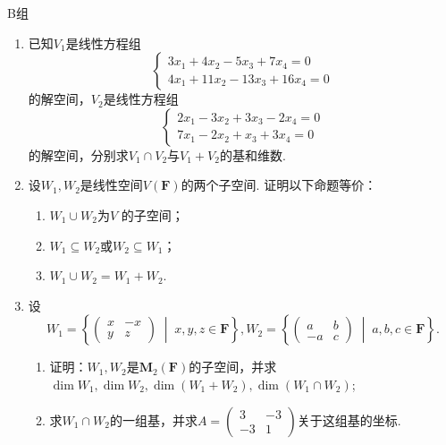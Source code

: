 \centerline{\heiti B组}
\begin{enumerate}
    \item 已知$V_1$是线性方程组\[\begin{cases}
                  3x_1+4x_2-5x_3+7x_4=0 \\
                  4x_1+11x_2-13x_3+16x_4=0
              \end{cases}\]
          的解空间，$V_2$是线性方程组\[\begin{cases}
                  2x_1-3x_2+3x_3-2x_4=0 \\
                  7x_1-2x_2+x_3+3x_4=0
              \end{cases}\]
          的解空间，分别求$V_1 \cap V_2$与$V_1+V_2$的基和维数.

    \item 设$W_1,W_2$是线性空间$V(\mathbf{F})$的两个子空间. 证明以下命题等价：
          \begin{enumerate}
              \item $W_1 \cup W_2$为$V$ 的子空间；

              \item $W_1 \subseteq W_2$或$W_2 \subseteq W_1$；

              \item $W_1 \cup W_2=W_1+W_2$.
          \end{enumerate}

    \item 设\[W_1=\left\{\begin{pmatrix}
                  x & -x \\ y & z
              \end{pmatrix} \;\middle|\; x,y,z\in \mathbf{F} \right\},W_2=\left\{\begin{pmatrix}
                  a & b \\ -a & c
              \end{pmatrix} \;\middle|\; a,b,c\in \mathbf{F} \right\}.\]

          \begin{enumerate}
              \item 证明：$W_1,W_2$是$\mathbf{M}_2(\mathbf{F})$的子空间，并求$\dim W_1,\dim W_2,\dim(W_1+W_2),\dim(W_1\cap W_2)$;

              \item 求$W_1\cap W_2$的一组基，并求$A=\begin{pmatrix}
                            3 & -3 \\ -3 & 1
                        \end{pmatrix}$关于这组基的坐标.
          \end{enumerate}


\end{enumerate}
